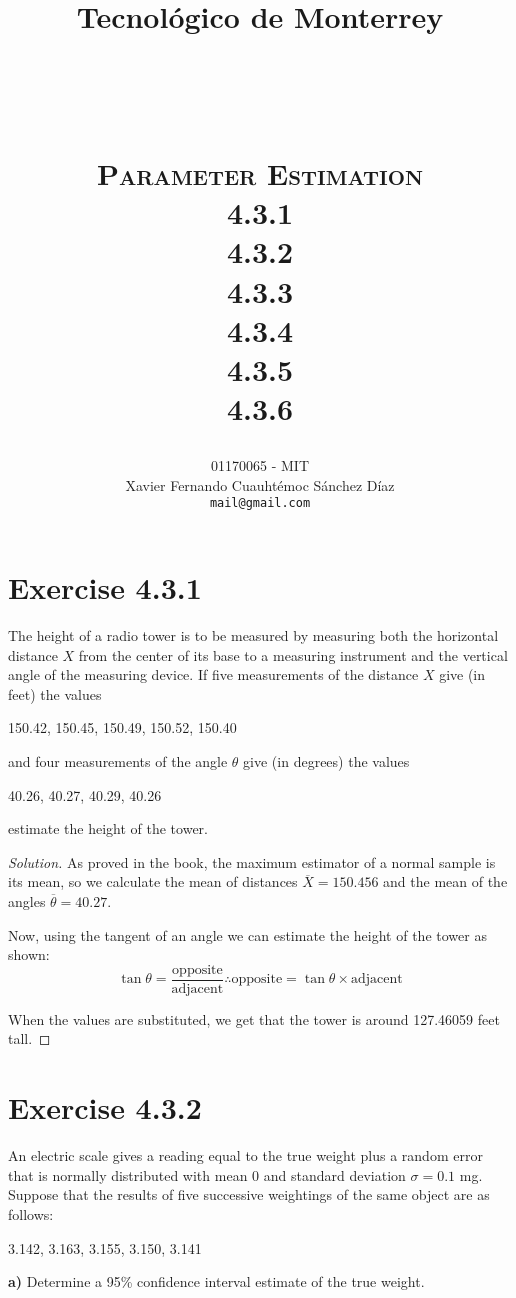 \documentclass[titlepage, letterpaper]{article} %
\title{
\vspace{1in}
\textbf{Tecnológico de Monterrey} \\
\vspace{0.5in}
\textmd{\mahclass} \\
\large{\textit{\mahteacher}} \\
\vspace{0.5in}
\textsc{\mahtitle}\\
\textsc{Parameter Estimation}\\
\textsc{4.3.1}\\
\textsc{4.3.2}\\
\textsc{4.3.3}\\
\textsc{4.3.4}\\
\textsc{4.3.5}\\
\textsc{4.3.6}\\
\author{01170065  - MIT \\
Xavier Fernando Cuauhtémoc Sánchez Díaz \\
\texttt{mail@gmail.com}}
\date{\mahdate}
}
\renewcommand\qedsymbol{\(\blacksquare\)}
\newenvironment{solution}
{\renewcommand\qedsymbol{$\square$}\begin{proof}[Solution]}
{\end{proof}}
\begin{document}
\begin{titlepage}
\maketitle
\end{titlepage}

%
%

\section{Exercise 4.3.1}

{\large The height of a radio tower is to be measured by measuring both the horizontal distance $X$ from the center of its base to a measuring instrument and the vertical angle of the measuring device.
If five measurements of the distance $X$ give (in feet) the values

150.42, 150.45, 150.49, 150.52, 150.40

and four measurements of the angle $\theta$ give (in degrees) the values

40.26, 40.27, 40.29, 40.26

estimate the height of the tower.}

\begin{solution}
As proved in the book, the maximum estimator of a normal sample is its mean, so we calculate the mean of distances $\overline{X} = 150.456$ and the mean of the angles $\overline{\theta} = 40.27$.

Now, using the tangent of an angle we can estimate the height of the tower as shown:
\[\tan \theta = \frac{\text{opposite}}{\text{adjacent}} \therefore \text{opposite} = \tan\theta \times \text{adjacent}\]

When the values are substituted, we get that the tower is around 127.46059 feet tall.
\end{solution}

\section{Exercise 4.3.2}

{\large An electric scale gives a reading equal to the true weight plus a random error that is normally distributed with mean 0 and standard deviation $\sigma = 0.1$ mg.
Suppose that the results of five successive weightings of the same object are as follows:

3.142, 3.163, 3.155, 3.150, 3.141

\textbf{a)} Determine a 95\% confidence interval estimate of the true weight.}
\end{document}
